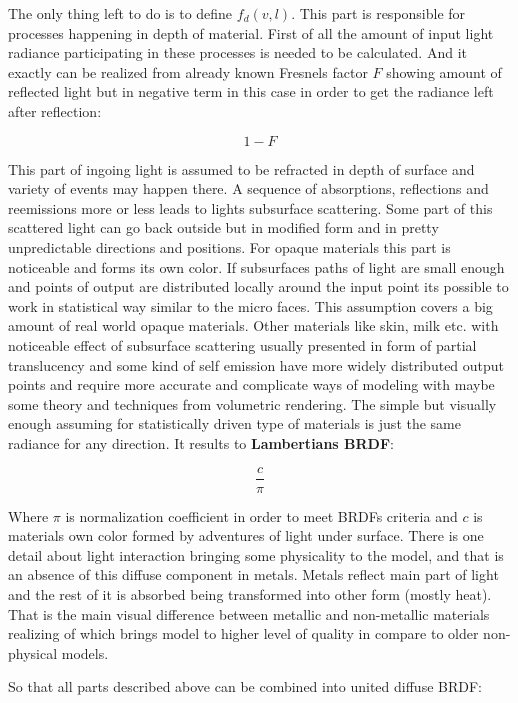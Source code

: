 The only thing left to do is to define $f_d(v,l)$. This part is responsible for processes happening in depth of material. First of all the amount of input light radiance participating in these processes is needed to be calculated. And it exactly can be realized from already known Fresnel\textquotesingle{}s factor $F$ showing amount of reflected light but in negative term in this case in order to get the radiance left after reflection\+:

\[1-F\]

This part of ingoing light is assumed to be refracted in depth of surface and variety of events may happen there. A sequence of absorptions, reflections and reemissions more or less leads to light\textquotesingle{}s subsurface scattering. Some part of this scattered light can go back outside but in modified form and in pretty unpredictable directions and positions. For opaque materials this part is noticeable and forms it\textquotesingle{}s own color. If subsurface\textquotesingle{}s paths of light are small enough and points of output are distributed locally around the input point it\textquotesingle{}s possible to work in statistical way similar to the micro faces. This assumption covers a big amount of real world opaque materials. Other materials like skin, milk etc. with noticeable effect of subsurface scattering usually presented in form of partial translucency and some kind of self emission have more widely distributed output points and require more accurate and complicate ways of modeling with maybe some theory and techniques from volumetric rendering. The simple but visually enough assuming for statistically driven type of materials is just the same radiance for any direction. It results to {\bfseries Lambertian\textquotesingle{}s B\+R\+DF}\+:

\[\frac{c}{\pi}\]

Where $\pi$ is normalization coefficient in order to meet B\+R\+DF\textquotesingle{}s criteria and $c$ is material\textquotesingle{}s own color formed by adventures of light under surface. There is one detail about light interaction bringing some physicality to the model, and that is an absence of this diffuse component in metals. Metals reflect main part of light and the rest of it is absorbed being transformed into other form (mostly heat). That is the main visual difference between metallic and non-\/metallic materials realizing of which brings model to higher level of quality in compare to older non-\/physical models.

So that all parts described above can be combined into united diffuse B\+R\+DF\+:

